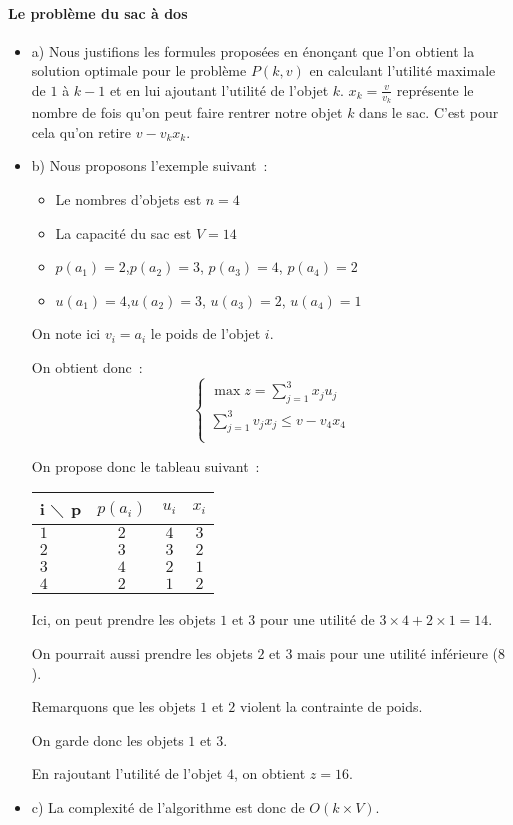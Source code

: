 \paragraph{Le problème du sac à dos}
\begin{itemize}
\item a) Nous justifions les formules proposées en énonçant que l'on
  obtient la solution optimale pour le problème $P(k,v)$ en calculant
  l'utilité maximale de $1$ à $k-1$ et en lui ajoutant l'utilité de
  l'objet $k$. $x_k = \frac{v}{v_k}$ représente le nombre de fois
  qu'on peut faire rentrer notre objet $k$ dans le sac. C'est pour
  cela qu'on retire $v - v_kx_k$.
\item b) Nous proposons l'exemple suivant~:
\begin{itemize}
\item Le nombres d'objets est $n = 4$
\item La capacité du sac est $V = 14$
\item $p(a_1)=2$,$p(a_2)=3$, $p(a_3)=4$, $p(a_4)=2$
\item $u(a_1)=4$,$u(a_2)=3$, $u(a_3)=2$, $u(a_4)=1$
\end{itemize}
On note ici $v_i=a_i$ le poids de l'objet $i$.

On obtient donc~:
\begin{equation}
\begin{cases}
\max z = \sum_{j=1}^3 x_ju_j \\
\sum_{j=1}^3v_jx_j \leq v - v_4x_4 \\
\end{cases}
\end{equation}

On propose donc le tableau suivant~:
\begin{center}
\begin{tabular}{|l|c|c|c|}
\hline  i $\diagdown$ p  & $p(a_i)$ & $u_i$ & $x_i$  \\
\hline $1$ & $2$ & $4$ & $3$ \\
\hline $2$ & $3$ & $3$ & $2$  \\
\hline $3$ & $4$ & $2$ & $1$ \\
\hline $4$ & $2$ & $1$ & $2$ \\
\hline
\end{tabular}
\end{center}
\vspace{1cm}
Ici, on peut prendre les objets $1$ et $3$ pour une utilité de
$3 \times 4 + 2 \times 1 = 14$.


On pourrait aussi prendre les objets $2$ et $3$ mais pour une utilité
inférieure ($8$).

Remarquons que les objets $1$ et $2$ violent la contrainte de poids.


On garde donc les objets $1$ et $3$.

En rajoutant l'utilité de l'objet $4$, on obtient $z=16$.

\item c) La complexité de l'algorithme est donc de $O(k \times V)$.
\end{itemize}

